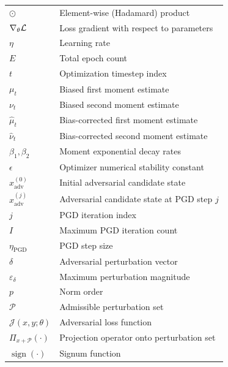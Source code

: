 \begin{longtable}{@{} p{} p{} @{}}
$\odot$ & Element-wise (Hadamard) product \\
$\nabla_\theta \mathcal{L}$ & Loss gradient with respect to parameters \\
$\eta$ & Learning rate \\
$E$ & Total epoch count \\
$t$ & Optimization timestep index \\
$\mu_t$ & Biased first moment estimate \\
$\nu_t$ & Biased second moment estimate \\
$\hat{\mu}_t$ & Bias-corrected first moment estimate \\
$\hat{\nu}_t$ & Bias-corrected second moment estimate \\
$\beta_1, \beta_2$ & Moment exponential decay rates \\
$\epsilon$ & Optimizer numerical stability constant \\
$x_{\mathrm{adv}}^{(0)}$ & Initial adversarial candidate state \\
$x_{\mathrm{adv}}^{(j)}$ & Adversarial candidate state at PGD step $j$ \\
$j$ & PGD iteration index \\
$I$ & Maximum PGD iteration count \\
$\eta_{\mathrm{PGD}}$ & PGD step size \\
$\delta$ & Adversarial perturbation vector \\
$\varepsilon_\delta$ & Maximum perturbation magnitude \\
$p$ & Norm order \\
$\mathcal{P}$ & Admissible perturbation set \\
$\mathcal{J}(x, y; \theta)$ & Adversarial loss function \\
$\Pi_{x + \mathcal{P}}(\cdot)$ & Projection operator onto perturbation set \\
$\operatorname{sign}(\cdot)$ & Signum function \\
\midrule


\end{longtable}
